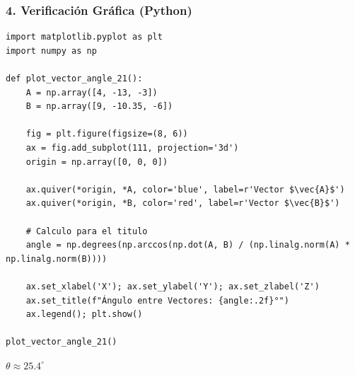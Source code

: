\documentclass[12pt, a4paper]{article}
\begin{document}
\subsubsection*{4. Verificación Gráfica (Python)}
\begin{lstlisting}
import matplotlib.pyplot as plt
import numpy as np

def plot_vector_angle_21():
    A = np.array([4, -13, -3])
    B = np.array([9, -10.35, -6])
    
    fig = plt.figure(figsize=(8, 6))
    ax = fig.add_subplot(111, projection='3d')
    origin = np.array([0, 0, 0])
    
    ax.quiver(*origin, *A, color='blue', label=r'Vector $\vec{A}$')
    ax.quiver(*origin, *B, color='red', label=r'Vector $\vec{B}$')
    
    # Calculo para el titulo
    angle = np.degrees(np.arccos(np.dot(A, B) / (np.linalg.norm(A) * np.linalg.norm(B))))
    
    ax.set_xlabel('X'); ax.set_ylabel('Y'); ax.set_zlabel('Z')
    ax.set_title(f"Ángulo entre Vectores: {angle:.2f}°")
    ax.legend(); plt.show()

plot_vector_angle_21()
\end{lstlisting}

\begin{tcolorbox}[colback=green!5!white, colframe=green!50!black, title=Respuesta Final]
\centering \Large $\theta \approx 25.4^\circ$
\end{tcolorbox}
\end{document}
